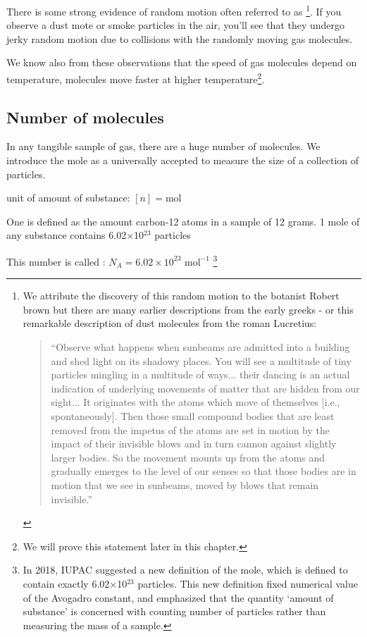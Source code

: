 There is some strong evidence of random motion often referred to as \footnote{We attribute the discovery of this random motion to the botanist Robert brown but there are many earlier descriptions from the early greeks - or this remarkable description of dust molecules from the roman Lucretius: \begin{quote}
    
``Observe what happens when sunbeams are admitted into a building and shed light on its shadowy places. You will see a multitude of tiny particles mingling in a multitude of ways... their dancing is an actual indication of underlying movements of matter that are hidden from our sight... It originates with the atoms which move of themselves [i.e., spontaneously]. Then those small compound bodies that are least removed from the impetus of the atoms are set in motion by the impact of their invisible blows and in turn cannon against slightly larger bodies. So the movement mounts up from the atoms and gradually emerges to the level of our senses so that those bodies are in motion that we see in sunbeams, moved by blows that remain invisible.''\end{quote}}. If you observe a dust mote or smoke particles in the air, you'll see that they undergo jerky random motion due to collisions with the randomly moving gas molecules. 

We know also from these observations that the speed of gas molecules depend on temperature, molecules move faster at higher temperature\footnote{We will prove this statement later in this chapter.}.


\subsection{Number of molecules}

In any tangible sample of gas, there are a huge number of molecules. We introduce the mole as a universally accepted  to measure the size of a collection of particles.

\cmt unit of amount of substance: $[n] = \text{mol}$

\begin{ilight}
	One  is defined as the amount carbon-12 atoms in a sample of 12 grams. 1 mole of any substance contains 6.02$\times$10$^{23}$ particles
\end{ilight}

This number is called : $N_A = 6.02\times10^{23} \text{ mol}^{-1}$ \footnote{In 2018, IUPAC suggested a new definition of the mole, which is defined to contain exactly 6.02$\times$10$^{23}$ particles. This new definition fixed numerical value of the Avogadro constant, and emphasized that the quantity `amount of substance' is concerned with counting number of particles rather than measuring the mass of a sample.}

